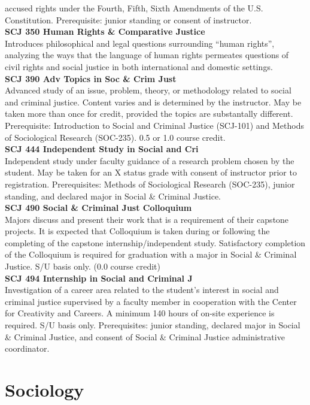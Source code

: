 \documentclass[
  letterpaper,
]{scrbook}
\begin{document}
accused rights under the Fourth, Fifth, Sixth Amendments of the U.S.
Constitution. Prerequisite: junior standing or consent of instructor.\\
\textbf{SCJ 350 Human Rights \& Comparative Justice}\\
Introduces philosophical and legal questions surrounding ``human
rights'', analyzing the ways that the language of human rights permeates
questions of civil rights and social justice in both international and
domestic settings.\\
\textbf{SCJ 390 Adv Topics in Soc \& Crim Just}\\
Advanced study of an issue, problem, theory, or methodology related to
social and criminal justice. Content varies and is determined by the
instructor. May be taken more than once for credit, provided the topics
are substantally different. Prerequisite: Introduction to Social and
Criminal Justice (SCJ-101) and Methods of Sociological Research
(SOC-235). 0.5 or 1.0 course credit.\\
\textbf{SCJ 444 Independent Study in Social and Cri}\\
Independent study under faculty guidance of a research problem chosen by
the student. May be taken for an X status grade with consent of
instructor prior to registration. Prerequisites: Methods of Sociological
Research (SOC-235), junior standing, and declared major in Social \&
Criminal Justice.\\
\textbf{SCJ 490 Social \& Criminal Just Colloquium}\\
Majors discuss and present their work that is a requirement of their
capstone projects. It is expected that Colloquium is taken during or
following the completing of the capstone internship/independent study.
Satisfactory completion of the Colloquium is required for graduation
with a major in Social \& Criminal Justice. S/U basis only. (0.0 course
credit)\\
\textbf{SCJ 494 Internship in Social and Criminal J}\\
Investigation of a career area related to the student's interest in
social and criminal justice supervised by a faculty member in
cooperation with the Center for Creativity and Careers. A minimum 140
hours of on-site experience is required. S/U basis only. Prerequisites:
junior standing, declared major in Social \& Criminal Justice, and
consent of Social \& Criminal Justice administrative coordinator.

\section{Sociology}\label{sociology}
\end{document}

